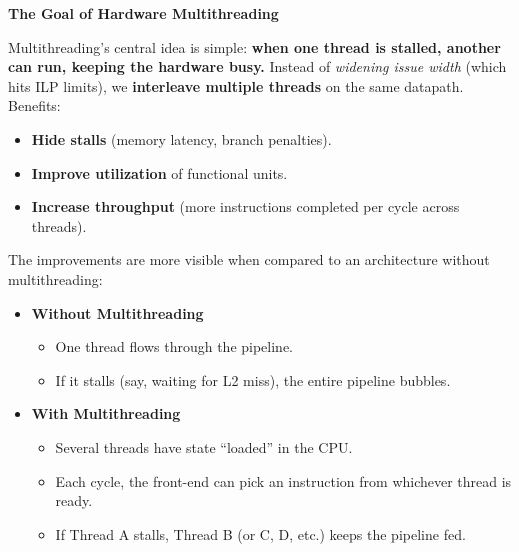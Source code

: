 \highspace
\begin{flushleft}
    \textcolor{Green3}{ \textbf{The Goal of Hardware Multithreading}}
\end{flushleft}
Multithreading's central idea is simple: \textbf{when one thread is stalled, another can run, keeping the hardware busy.} Instead of \emph{widening issue width} (which hits ILP limits), we \textbf{interleave multiple threads} on the same datapath. Benefits:
\begin{itemize}
    \item[\textcolor{Green3}{\faIcon{check}}] \textcolor{Green3}{\textbf{Hide stalls}} (memory latency, branch penalties).
    \item[\textcolor{Green3}{\faIcon{check}}] \textcolor{Green3}{\textbf{Improve utilization}} of functional units.
    \item[\textcolor{Green3}{\faIcon{check}}] \textcolor{Green3}{\textbf{Increase throughput}} (more instructions completed per cycle across threads).
\end{itemize}
The improvements are more visible when compared to an architecture without multithreading:
\begin{itemize}
    \item[\textcolor{Red2}{\faIcon{times}}] \textbf{Without Multithreading}
    \begin{itemize}
        \item One thread flows through the pipeline.
        \item If it stalls (say, waiting for L2 miss), the entire pipeline bubbles.
    \end{itemize}
    \item[\textcolor{Green3}{\faIcon{check}}] \textbf{With Multithreading}
    \begin{itemize}
        \item Several threads have state ``loaded'' in the CPU.
        \item Each cycle, the front-end can pick an instruction from whichever thread is ready.
        \item If Thread A stalls, Thread B (or C, D, etc.) keeps the pipeline fed.
    \end{itemize}
\end{itemize}

\newpage

